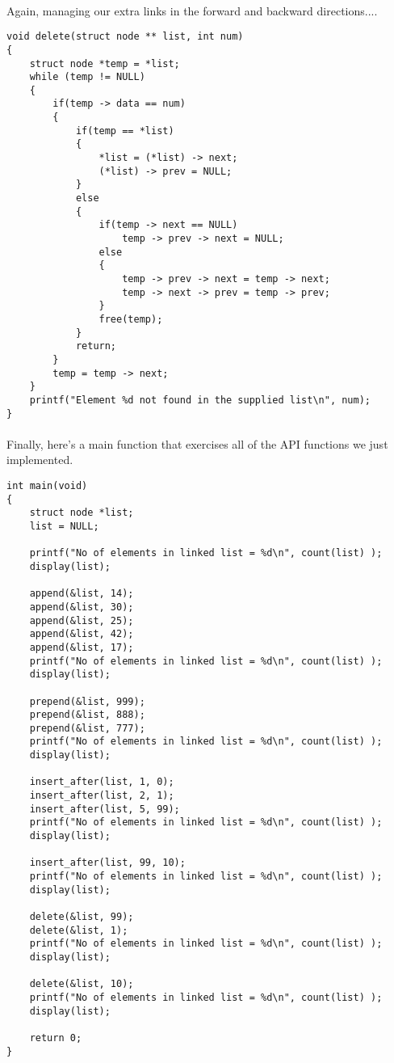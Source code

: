 \documentclass[10pt, a4paper, twosize]{article}
\begin{document}
\paragraph{} 

\paragraph{} Again, managing our extra links in the forward and backward directions....
\begin{lstlisting}
void delete(struct node ** list, int num)
{
    struct node *temp = *list;
    while (temp != NULL)
    {
        if(temp -> data == num)
        {
            if(temp == *list)
            {
                *list = (*list) -> next;
                (*list) -> prev = NULL;
            }
            else
            {
                if(temp -> next == NULL)
                    temp -> prev -> next = NULL;
                else
                {
                    temp -> prev -> next = temp -> next;
                    temp -> next -> prev = temp -> prev;
                }
                free(temp);
            }
            return;
        }
        temp = temp -> next;
    }
    printf("Element %d not found in the supplied list\n", num);
}
\end{lstlisting}
\paragraph{} 

\paragraph{} Finally, here's a main function that exercises all of the API functions we just implemented.
\begin{lstlisting}
int main(void)
{
    struct node *list;
    list = NULL;
    
    printf("No of elements in linked list = %d\n", count(list) );
    display(list);

    append(&list, 14);
    append(&list, 30);
    append(&list, 25);
    append(&list, 42);
    append(&list, 17);
    printf("No of elements in linked list = %d\n", count(list) );
    display(list);

    prepend(&list, 999);
    prepend(&list, 888);
    prepend(&list, 777);
    printf("No of elements in linked list = %d\n", count(list) );
    display(list);

    insert_after(list, 1, 0);
    insert_after(list, 2, 1);
    insert_after(list, 5, 99);
    printf("No of elements in linked list = %d\n", count(list) );
    display(list);

    insert_after(list, 99, 10);
    printf("No of elements in linked list = %d\n", count(list) );
    display(list);

    delete(&list, 99);
    delete(&list, 1);
    printf("No of elements in linked list = %d\n", count(list) );
    display(list);

    delete(&list, 10);
    printf("No of elements in linked list = %d\n", count(list) );
    display(list);

    return 0;
}
\end{lstlisting}
\end{document}
